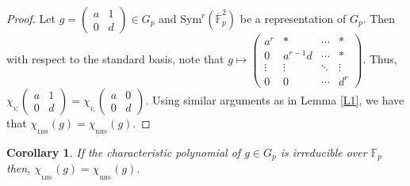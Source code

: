 \documentclass[10pt, reqno]{amsart}
\def\F{{\mathbb F}}
\def\OFs{{\overline{\mathbb F}}_p^2}
\def\Gp{{G_p}}
\def\CL{{\chi_{_{\mathrm{LHS}}}}}
\def\CR{{\chi_{_{\mathrm{RHS}}}}}
\numberwithin{equation}{section}
\newtheorem{corollary}[theorem]{Corollary}%
\theoremstyle{remark}
\begin{document}
	\begin{proof}
		Let $g=\left(
		\begin{matrix}
			a & 1\\
			0 & d
		\end{matrix}
		\right)\in \Gp$ and $\text{Sym}^r(\OFs)$ be a representation of $\Gp.$ Then with respect to the standard basis, note that $g\longmapsto \left(\begin{matrix}
			a^r &*&\cdots&*\\
			0 &a^{r-1}d&\cdots& *\\
			\vdots&\vdots&\ddots&\vdots\\
			0&0&\cdots&d^r
		\end{matrix}
		\right).$ Thus, $\chi_{_{V_r}}\left(\begin{matrix}
			a & 1\\
			0 & d
		\end{matrix}
		\right)=\chi_{_{V_r}}\left(
		\begin{matrix}
			a & 0\\
			0 & d
		\end{matrix}
		\right).$ Using similar arguments as in Lemma \ref{L1}, we have that $\CL(g)=\CR(g).$
	\end{proof}
	
	\begin{corollary}\label{C2}
		If the characteristic polynomial of $g\in \Gp$ is irreducible over $\F_p$ then, $\CL(g)=\CR(g).$
	\end{corollary}
	
\end{document}
